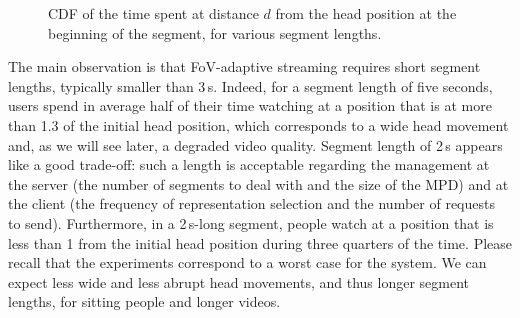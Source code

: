 \begin{figure}[htbp]
\centering

\caption{CDF of the time spent at distance $d$ from the head position at the beginning of the 
segment, for various segment lengths.}\label{cdf-dataset}
\end{figure}

The main observation is that FoV-adaptive streaming requires short segment lengths, typically 
smaller than 3\,s. Indeed, for a segment length of five seconds,
users spend in average half of their time watching at a position that is at more than 
1.3 of the initial head position,
which corresponds to a wide head movement and, as we will see later, a degraded video quality.
Segment length of 2\,s appears like a good trade-off: such a length is acceptable regarding the
management at the server (the number of segments to deal with and the size of the \ac{MPD})
and at the client (the frequency of representation selection and the number of requests
to send). Furthermore, in a 2\,s-long segment, people watch
at a position that is less than 1 from the initial head position during three quarters 
of the time. Please recall that the experiments correspond to a worst case for the system. 
We can expect less
wide and less abrupt head movements, and thus longer segment lengths, for sitting 
people and longer videos.